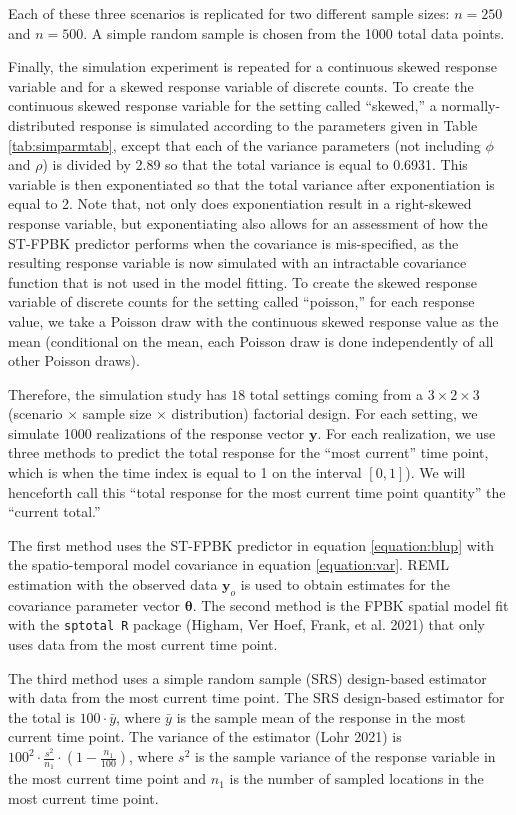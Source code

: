 \documentclass[]{article}    %
\begin{document}
Each of these three scenarios is replicated for two different sample
sizes: \(n = 250\) and \(n = 500\). A simple random sample is chosen
from the 1000 total data points.

Finally, the simulation experiment is repeated for a continuous skewed
response variable and for a skewed response variable of discrete counts.
To create the continuous skewed response variable for the setting called
``skewed,'' a normally-distributed response is simulated according to
the parameters given in Table \ref{tab:simparmtab}, except that each of
the variance parameters (not including \(\phi\) and \(\rho\)) is divided
by 2.89 so that the total variance is equal to 0.6931. This variable is
then exponentiated so that the total variance after exponentiation is
equal to 2. Note that, not only does exponentiation result in a
right-skewed response variable, but exponentiating also allows for an
assessment of how the ST-FPBK predictor performs when the covariance is
mis-specified, as the resulting response variable is now simulated with
an intractable covariance function that is not used in the model
fitting. To create the skewed response variable of discrete counts for
the setting called ``poisson,'' for each response value, we take a
Poisson draw with the continuous skewed response value as the mean
(conditional on the mean, each Poisson draw is done independently of all
other Poisson draws).

Therefore, the simulation study has \(18\) total settings coming from a
\(3 \times 2 \times 3\) (scenario \(\times\) sample size \(\times\)
distribution) factorial design. For each setting, we simulate 1000
realizations of the response vector \(\mathbf{y}\). For each
realization, we use three methods to predict the total response for the
``most current'' time point, which is when the time index is equal to 1
on the interval \([0, 1]\)). We will henceforth call this ``total
response for the most current time point quantity'' the ``current
total.''

The first method uses the ST-FPBK predictor in equation
\ref{equation:blup} with the spatio-temporal model covariance in
equation \ref{equation:var}. REML estimation with the observed data
\(\mathbf{y}_o\) is used to obtain estimates for the covariance
parameter vector \(\bm{\theta}\). The second method is the FPBK spatial
model fit with the \texttt{sptotal R} package (Higham, Ver Hoef, Frank,
et al. 2021) that only uses data from the most current time point.

The third method uses a simple random sample (SRS) design-based
estimator with data from the most current time point. The SRS
design-based estimator for the total is \(100 \cdot \bar{y}\), where
\(\bar{y}\) is the sample mean of the response in the most current time
point. The variance of the estimator (Lohr 2021) is
\(100^2 \cdot \frac{s^2}{n_1} \cdot (1 - \frac{n_1}{100})\), where
\(s^2\) is the sample variance of the response variable in the most
current time point and \(n_1\) is the number of sampled locations in the
most current time point.
\end{document}
